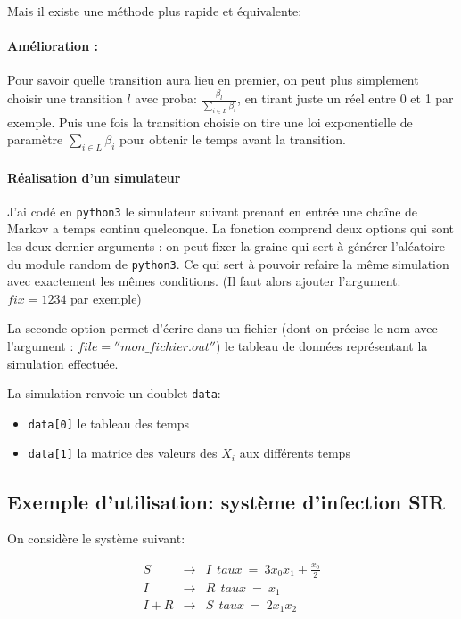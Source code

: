\documentclass[a4paper,12pt]{report}
\def\D{\displaystyle}
\begin{document}
Mais il existe  une méthode plus rapide et équivalente:

\paragraph{Amélioration :}


Pour savoir quelle transition aura lieu en premier, on peut plus
simplement choisir une transition $\D l$ avec proba:
$\D \frac{\beta_l}{\sum_{i \in L}\beta_i}$, en tirant juste un réel entre 0 et 1 par exemple.
Puis une fois la transition choisie on tire une loi exponentielle de
paramètre $\D \sum_{i \in L}\beta_i$ pour obtenir le temps avant la
transition.


\paragraph{Réalisation d'un simulateur} 

J'ai codé en \texttt{python3} le simulateur suivant prenant en entrée une chaîne
de Markov a temps continu quelconque. La fonction comprend deux
options qui sont les deux dernier arguments : on peut fixer la graine
qui sert à générer l'aléatoire du module random de \texttt{python3}. Ce qui
sert à pouvoir refaire la même simulation avec exactement les mêmes
conditions. (Il faut alors ajouter l'argument: $\D fix=1234$ par exemple)

La seconde option permet d'écrire dans un fichier (dont on
précise le nom avec l'argument : $\D file=''mon\_fichier.out''$) le tableau
de données représentant la simulation effectuée.

La simulation renvoie un doublet \texttt{data}:
\begin{itemize}
\item \texttt{data[0]} le tableau des temps
\item \texttt{data[1]} la matrice des valeurs des $\D X_i$ aux
  différents temps
\end{itemize}

\subsection{Exemple d'utilisation: système d'infection SIR}
On considère le système suivant:

\begin{eqnarray}
  S & \rightarrow & I \ \ taux \  = \  3x_0x_1+\frac{x_0}{2}\\
  I & \rightarrow & R \ \ taux \ = \ x_1\\
  I+R & \rightarrow & S \ \ taux \ = \ 2x_1x_2 
\end{eqnarray}
\end{document}
